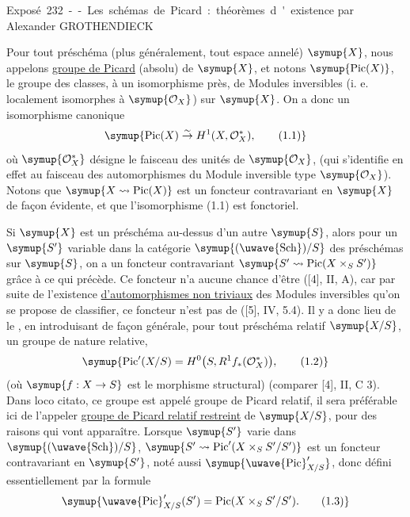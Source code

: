 \unit{Exposé 232 -- Les schémas de Picard : théorèmes d'existence}
%
  {par Alexander GROTHENDIECK}


Pour tout préschéma (plus généralement, tout espace annelé) $\symup{X}$, nous appelons
\uline{groupe de Picard} (absolu) de $\symup{X}$, et notons $\symup{\operatorname{Pic}(X)}$, le
groupe des classes, à un isomorphisme près, de Modules inversibles (i. e.
localement isomorphes à $\symup{\mathcal O_X}$) sur $\symup{X}$. On a donc un isomorphisme
canonique
\begin{equation}
\symup{\operatorname{Pic}(X)\overset{\sim}{\to}H^1(X,\mathcal O_X^*),
\tag{1.1}}
\end{equation}
où $\symup{\mathcal O_X^*}$ désigne le faisceau des unités de $\symup{\mathcal O_X}$, (qui
s'identifie en effet au faisceau des automorphismes du Module inversible type
$\symup{\mathcal O_X}$). Notons que $\symup{X\rightsquigarrow\operatorname{Pic}(X)}$ est un foncteur
contravariant en $\symup{X}$ de façon évidente, et que l'isomorphisme (1.1) est
fonctoriel.

Si $\symup{X}$ est un préschéma au-dessus d'un autre $\symup{S}$, alors pour un $\symup{S'}$ variable
dans la catégorie $\symup{(\text{\uwave{Sch}})/S}$ des préschémas sur $\symup{S}$, on a un foncteur
contravariant $\symup{S'\rightsquigarrow\operatorname{Pic}(X\times_S S')}$ grâce à ce qui
précède. Ce foncteur n'a aucune chance d'être  ([4], II, A),
car par suite de l'existence \uline{d'automorphismes non triviaux} des Modules
inversibles qu'on se propose de classifier, ce foncteur n'est pas de  ([5], IV, 5.4). Il y a donc lieu de le , en introduisant
de façon générale, pour tout préschéma relatif $\symup{X/S}$, un groupe de nature
relative,
\begin{equation}
\symup{\operatorname{Pic}'(X/S)=H^0\bigl(S,R^1f_*(\mathcal O_X^*)\bigr),
\tag{1.2}}
\end{equation}
(où $\symup{f:X\to S}$ est le morphisme structural) (comparer [4], II,
C 3). Dans loco citato, ce groupe est appelé groupe de Picard relatif, il sera
préférable ici de l'appeler \uline{groupe de Picard relatif restreint} de $\symup{X/S}$,
pour des raisons qui vont apparaître. Lorsque $\symup{S'}$ varie dans $\symup{(\text{\uwave{Sch}})/S}$,
$\symup{S'\rightsquigarrow\operatorname{Pic}'(X\times_S S'/S')}$ est un foncteur
contravariant en $\symup{S'}$, noté aussi $\symup{\mathop{\text{\uwave{Pic}}}\nolimits'_{X/S}}$, donc défini
essentiellement par la formule
\begin{equation}
\symup{\mathop{\text{\uwave{Pic}}}\nolimits'_{X/S}(S')=
\operatorname{Pic}(X\times_S S'/S').
\tag{1.3}}
\end{equation}

